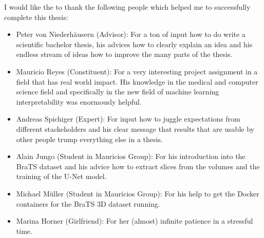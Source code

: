 I would like the to thank the following people which helped me to successfully complete this thesis:
\begin{itemize}
    \item Peter von Niederhäusern (Advisor): For a ton of input how to do write a scientific bachelor thesis, his advices how to clearly explain an idea and his endless stream of ideas how to improve the many parts of the thesis.
    \item Mauricio Reyes (Constituent): For a very interesting project assignment in a field that has real world impact. His knowledge in the medical and computer science field and specifically in the new field of machine learning interpretability was enormously helpful.
    \item Andreas Spichiger (Expert): For input how to juggle expectations from different stackeholders and his clear message that results that are usable by other people trump everything else in a thesis.
    \item Alain Jungo (Student in Mauricios Group): For his introduction into the BraTS dataset and his advice how to extract slices from the volumes and the training of the U-Net model.
    \item Michael Müller (Student in Mauricios Group): For his help to get the Docker containers for the BraTS 3D dataset running.
    \item Marina Horner (Girlfriend): For her (almost) infinite patience in a stressful time.
\end{itemize}
